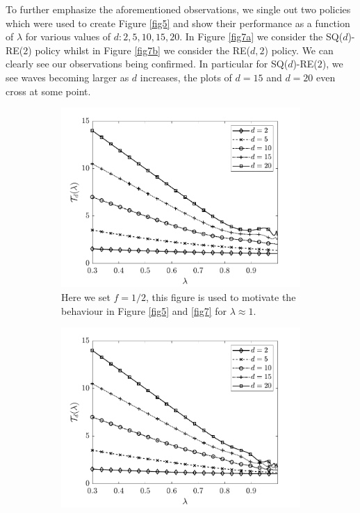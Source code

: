 \documentclass[12pt]{report}
\begin{document}
To further emphasize the aforementioned observations, we single out two policies which were used to create Figure \ref{fig5} and show their performance as a function of $\lambda$ for various values of $d: 2,5,10,15,20$. In Figure \ref{fig7a} we consider the SQ($d$)-RE($2$) policy whilst in Figure \ref{fig7b} we consider the RE($d,2$) policy. We can clearly see our observations being confirmed. In particular for SQ($d$)-RE($2$), we see waves becoming larger as $d$ increases, the plots of $d=15$ and $d=20$ even cross at some point.
\begin{figure}[t]
\begin{center}
\begin{subfigure}{0.43\textwidth}
\centering
\captionsetup{width=.8\linewidth}
\includegraphics[width=1\linewidth]{figures/Chapter7/fig4a.pdf}
\caption{Here we set $f=1/2$, this figure is used to motivate the behaviour in Figure \ref{fig5} and \ref{fig7} for $\lambda \approx 1$.}
\label{fig6a}
\end{subfigure}
\begin{subfigure}{.43\textwidth}
\centering
\captionsetup{width=.8\linewidth}
\includegraphics[width=1\linewidth]{figures/Chapter7/fig4b.pdf}

\end{subfigure}
\end{center}
\end{figure}
\end{document}
